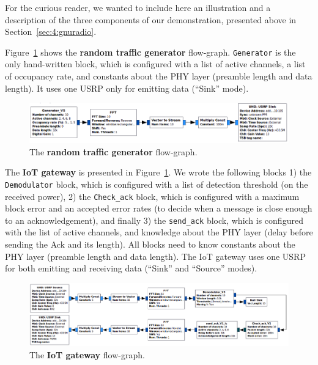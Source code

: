 For the curious reader, we wanted to include here an illustration and a description of the three components of our demonstration, presented above in Section~\ref{sec:4:gnuradio}.

Figure~\ref{fig:4app:USRP_TX_PU__v1__simple_grc} shows the \textbf{random traffic generator} flow-graph.
\texttt{Generator} is the only hand-written block, which is configured with a list of active channels, a list of occupancy rate, and constants about the PHY layer (preamble length and data length). It uses one USRP only for emitting data (``Sink'' mode).

\begin{figure}[!h]
	\centering
    \includegraphics[width=1.00\textwidth]{2-Chapters/4-Chapter/Images/USRP_TX_PU__v1__simple_grc.png}
    \caption{The \textbf{random traffic generator} flow-graph.}
    \label{fig:4app:USRP_TX_PU__v1__simple_grc}
\end{figure}


The \textbf{IoT gateway} is presented in Figure~\ref{fig:4app:USRP_TX_PU__v1__simple_grc}.
%
We wrote the following blocks
1) the \texttt{Demodulator} block, which is configured with a list of detection threshold (on the received power),
2) the \texttt{Check\_ack} block, which is configured with a maximum block error and an accepted error rates (to decide when a message is close enough to an acknowledgement), 
and finally 3) the \texttt{send\_ack} block, which is configured with the list of active channels, and knowledge about the PHY layer (delay before sending the Ack and its length). All blocks need to know constants about the PHY layer (preamble length and data length). The IoT gateway uses one USRP for both emitting and receiving data (``Sink'' and ``Source'' modes).

\begin{figure}[!h]
	\centering
    \includegraphics[width=1.00\textwidth]{2-Chapters/4-Chapter/Images/USRP_RX_BTS__v1__simple_grc.png}
    \caption{The \textbf{IoT gateway} flow-graph.}
    \label{fig:4app:USRP_RX_BTS__v1__simple_grc}
\end{figure}



